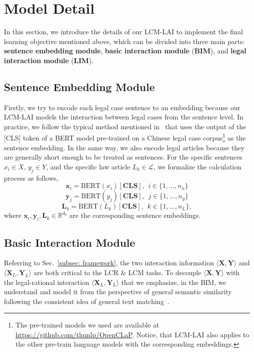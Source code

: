 \section{Model Detail} \label{sec:methods}
In this section, we introduce the details of our LCM-LAI to implement the final learning objective mentioned above, which can be divided into three main parts: \textbf{sentence embedding module}, \textbf{basic interaction module} (\textbf{BIM}), and \textbf{legal interaction module} (\textbf{LIM}).

\subsection{Sentence Embedding Module}
Firstly, we try to encode each legal case sentence to an embedding because our LCM-LAI models the interaction between legal cases from the sentence level.
In practice, we follow the typical method mentioned in~\cite{yu2022Explainable} that uses the output of the [CLS] token of a BERT model pre-trained on a Chinese legal case corpus\footnote{The pre-trained models we used are available at \url{https://github.com/thunlp/OpenCLaP}. 
Notice, that LCM-LAI also applies to the other pre-train language models with the corresponding embeddings.} as the sentence embedding. 
In the same way, we also encode legal articles because they are generally short enough to be treated as sentences.
For the specific sentences $x_i\in X$, $y_j\in Y$, and the specific law article $L_k\in \mathcal{L}$, we formalize the calculation process as follows,
$$
\mathbf{x}_i = \text{BERT}(x_i)[\textbf{CLS}], \ \ i \in \{1, \ldots, n_x\}
$$
$$
\mathbf{y}_j = \text{BERT}(y_j)[\textbf{CLS}], \ \ j \in \{1, \ldots, n_y\}
$$
$$
\mathbf{L}_k = \text{BERT}(L_k)[\textbf{CLS}], \ \ k \in \{1, \ldots, n_L\},
$$
where $\mathbf{x}_i, \mathbf{y}_i, \mathbf{L}_k \in \mathbb{R}^{d_b}$ are the corresponding sentence embeddings.

\subsection{Basic Interaction Module}
Referring to Sec.~\ref{subsec: framework}, the two interaction information $\langle \mathbf{X}, \mathbf{Y} \rangle$ and $\langle \mathbf{X}_L, \mathbf{Y}_L \rangle$ are both critical to the LCR \& LCM tasks.
To decouple $\langle \mathbf{X}, \mathbf{Y} \rangle$ with the legal-rational interaction $\langle \mathbf{X}_L, \mathbf{Y}_L \rangle$ that we emphasize, in the BIM, we understand and model it from the perspective of general semantic similarity following the consistent idea of general text matching~\cite{yu2022Explainable, reimers2019sentence-BERT, yin2016ABCNN}.

